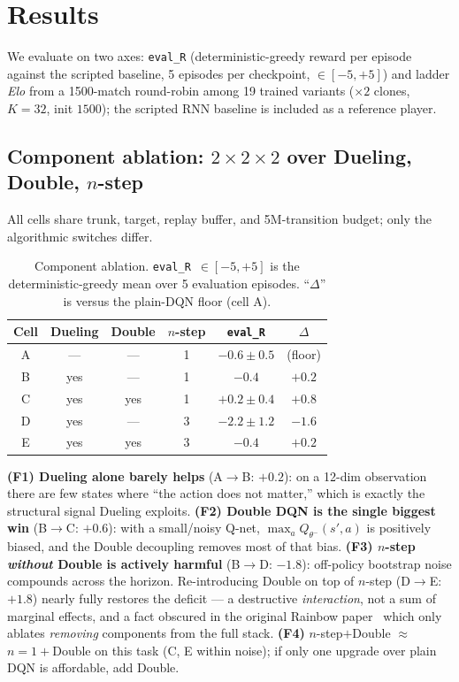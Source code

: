 \section{Results}
\label{sec:results}

We evaluate on two axes: \texttt{eval\_R} (deterministic-greedy reward
per episode against the scripted baseline, 5 episodes per checkpoint,
$\in[-5,+5]$) and ladder \emph{Elo} from a 1500-match round-robin among
19 trained variants ($\times 2$ clones, $K{=}32$, init $1500$); the
scripted RNN baseline is included as a reference player.

\subsection{Component ablation: $2{\times}2{\times}2$ over Dueling, Double, $n$-step}

All cells share trunk, target, replay buffer, and 5M-transition budget;
only the algorithmic switches differ.

\begin{table}[h]
\centering
\caption{Component ablation. \texttt{eval\_R}~$\in[-5,+5]$ is the
deterministic-greedy mean over 5 evaluation episodes. ``$\Delta$'' is
versus the plain-DQN floor (cell A).}
\label{tab:ablation}
\small
\begin{tabular}{cccccc}
\toprule
Cell & Dueling & Double & $n$-step & \texttt{eval\_R} & $\Delta$ \\
\midrule
A & --- & --- & 1 & $-0.6 \pm 0.5$ & (floor) \\
B & yes & --- & 1 & $-0.4$ & $+0.2$ \\
C & yes & yes & 1 & $\mathbf{+0.2 \pm 0.4}$ & $\mathbf{+0.8}$ \\
D & yes & --- & 3 & $-2.2 \pm 1.2$ & $-1.6$ \\
E & yes & yes & 3 & $-0.4$ & $+0.2$ \\
\bottomrule
\end{tabular}
\end{table}

\textbf{(F1) Dueling alone barely helps} (A$\to$B: $+0.2$): on a 12-dim
observation there are few states where ``the action does not matter,''
which is exactly the structural signal Dueling exploits.
\textbf{(F2) Double DQN is the single biggest win} (B$\to$C: $+0.6$):
with a small/noisy Q-net, $\max_a Q_{\theta^-}(s',a)$ is positively
biased, and the Double decoupling removes most of that bias.
\textbf{(F3) $n$-step \emph{without} Double is actively harmful}
(B$\to$D: $-1.8$): off-policy bootstrap noise compounds across the
horizon. Re-introducing Double on top of $n$-step (D$\to$E: $+1.8$)
nearly fully restores the deficit --- a destructive \emph{interaction},
not a sum of marginal effects, and a fact obscured in the original
Rainbow paper~\citep{hessel2018rainbow} which only ablates
\emph{removing} components from the full stack.
\textbf{(F4)} $n$-step$+$Double $\approx$ $n{=}1+$Double on this task
(C, E within noise); if only one upgrade over plain DQN is affordable,
add Double.

